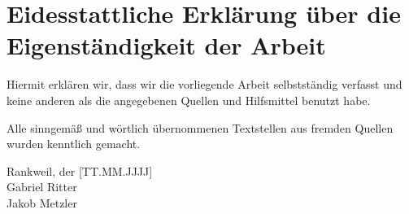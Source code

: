 \chapter*{Eidesstattliche Erklärung über die Eigenständigkeit der Arbeit}
Hiermit erklären wir, dass wir die vorliegende Arbeit selbstständig verfasst und keine anderen als die angegebenen Quellen und Hilfsmittel benutzt habe.

Alle sinngemäß und wörtlich übernommenen Textstellen aus fremden Quellen wurden kenntlich gemacht.

Rankweil, der [TT.MM.JJJJ]\\
Gabriel Ritter\\
Jakob Metzler